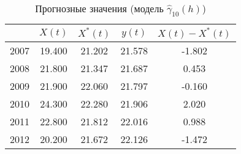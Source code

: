 \begin{table}[ht]
\centering
\caption{Прогнозные значения (модель $ \widehat{\gamma}_{10}(h) $)} 
\label{table:auto-class-18-prediction}
\begin{tabular}{r|cccc}
  \hline
 & $X(t)$ & $X^{*}(t)$ & $y(t)$ & $ X(t) - X^{*}(t) $ \\ 
  \hline
2007 & 19.400 & 21.202 & 21.578 & -1.802 \\ 
  2008 & 21.800 & 21.347 & 21.687 & 0.453 \\ 
  2009 & 21.900 & 22.060 & 21.797 & -0.160 \\ 
  2010 & 24.300 & 22.280 & 21.906 & 2.020 \\ 
  2011 & 22.800 & 21.812 & 22.016 & 0.988 \\ 
  2012 & 20.200 & 21.672 & 22.126 & -1.472 \\ 
   \hline
\end{tabular}
\end{table}
